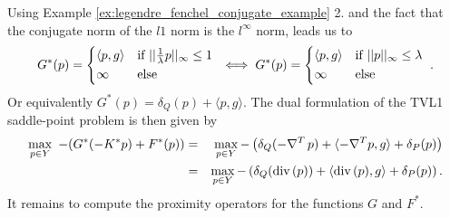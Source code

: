\documentclass[abstracton]{scrreprt}
\begin{document}
            Using Example \ref{ex:legendre_fenchel_conjugate_example} 2. and the fact that the conjugate norm of the $l1$ norm is the $l^{\infty}$ norm, leads us to
                $$
                    G^{\ast}(p) =
                        \begin{dcases*}
                            \langle p, g \rangle & \textnormal{if $||\frac{1}{\lambda}p||_{\infty} \le 1$} \\
                            \infty & \textnormal{else}
                        \end{dcases*} \iff
                    G^{\ast}(p) =
                        \begin{dcases*}
                            \langle p, g \rangle & \textnormal{if $||p||_{\infty} \le \lambda$} \\
                            \infty & \textnormal{else}
                        \end{dcases*}.
                $$
            Or equivalently $G^{\ast}(p) = \delta_{Q}(p) + \langle p, g \rangle$. The dual formulation of the TVL1 saddle-point problem is then given by
                \begin{eqnarray}
                    \max_{p \in Y}\,\, -(G^{\ast}(-K^{\ast}p) + F^{\ast}(p)) &=& \max_{p \in Y} -\left( \delta_{Q}(-\nabla^{T}\,p) + \langle -\nabla^{T}p, g \rangle + \delta_{P}(p) \right) \notag \\
                    &=& \max_{p \in Y} -\left( \delta_{Q}(\textnormal{div}\,(p)) + \langle \textnormal{div}\,(p), g \rangle + \delta_{P}(p) \right). \notag
                \end{eqnarray}
            It remains to compute the proximity operators for the functions $G$ and $F^{\ast}$.
\end{document}
